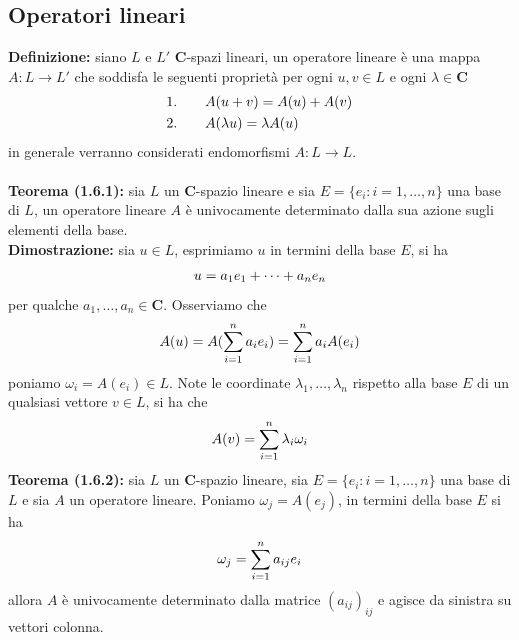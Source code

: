 \documentclass{article}
\begin{document}
\newpage
\subsection{Operatori lineari}
\textbf{Definizione:} siano $L$ e $L'$ $\mathbf{C}$-spazi lineari, un operatore lineare è una mappa $A : L \longrightarrow L'$ che soddisfa le seguenti proprietà per ogni $u, v \in L$ e ogni $\lambda \in \mathbf{C}$
\begin{align}
    1. \qquad &A(u + v) = A(u) + A(v) \notag \\
    2. \qquad &A(\lambda u) = \lambda A(u) \notag
\end{align}
in generale verranno considerati endomorfismi $A : L \longrightarrow L$. \\ \\
\textbf{Teorema (1.6.1):} sia $L$ un $\mathbf{C}$-spazio lineare e sia $E = \{e_i : i = 1, \dots, n\}$ una base di $L$, un operatore lineare $A$ è univocamente determinato dalla sua azione sugli elementi della base. \\

\textbf{Dimostrazione:} sia $u \in L$, esprimiamo $u$ in termini della base $E$, si ha
\begin{gather}
    u = a_1e_1 + \dots + a_ne_n \notag
\end{gather}
per qualche $a_1, \dots, a_n \in \mathbf{C}$. Osserviamo che
\begin{gather}
    A(u) = A(\sum_{i = 1}^n a_ie_i) = \sum_{i = 1}^n a_iA(e_i) \notag
\end{gather}
poniamo $\omega_i = A(e_i) \in L$. Note le coordinate $\lambda_1, \dots, \lambda_n$ rispetto alla base $E$ di un qualsiasi vettore $v \in L$, si ha che
\begin{gather}
    A(v) = \sum_{i = 1}^n \lambda_i\omega_i \notag
\end{gather}
\textbf{Teorema (1.6.2):} sia $L$ un $\mathbf{C}$-spazio lineare, sia $E = \{e_i : i = 1, \dots, n\}$ una base di $L$ e sia $A$ un operatore lineare. Poniamo $\omega_j = A(e_j)$, in termini della base $E$ si ha
\begin{gather}
    \omega_j = \sum_{i = 1}^n a_{ij}e_i \notag
\end{gather}
allora $A$ è univocamente determinato dalla matrice $(a_{ij})_{ij}$ e agisce da sinistra su vettori colonna. \\
\end{document}
